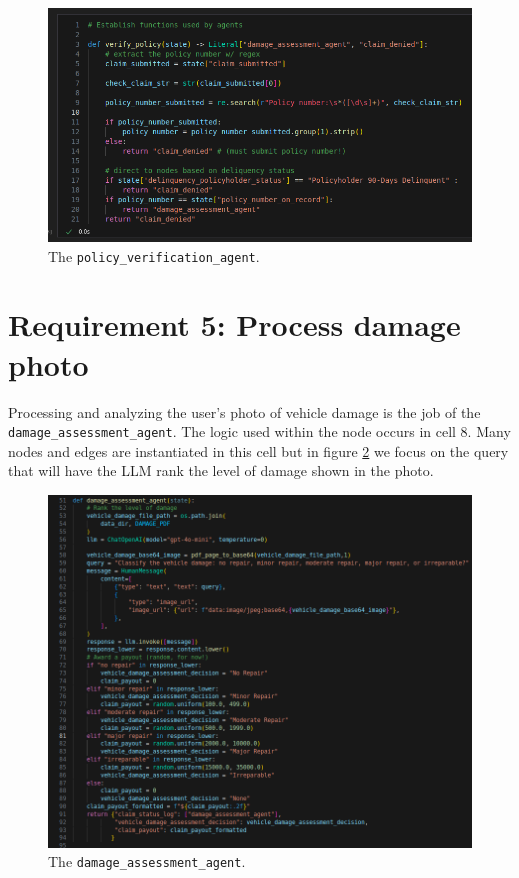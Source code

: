 \documentclass[11pt,letterpaper]{article}
\begin{document}
\begin{figure}[h!]
    \centering
    \includegraphics[width=1.0\linewidth]{cell_3.png}
    \caption{The \texttt{policy\_verification\_agent}.}
    \label{fig:cell3}
\end{figure}

\clearpage

\section*{Requirement 5: Process damage photo}
\tab Processing and analyzing the user's photo of vehicle damage is the job of the \texttt{damage\_assessment\_agent}. 
The logic used within the node occurs in cell 8. Many nodes and edges are instantiated in this cell but in figure \ref{fig:damage}
we focus on the query that will have the LLM rank the level of damage shown in the photo.

\begin{figure}[h!]
    \centering
    \includegraphics[width=0.75\linewidth]{damage_assessment_agent.png}
    \caption{The \texttt{damage\_assessment\_agent}.}
    \label{fig:damage}
\end{figure}
\end{document}
